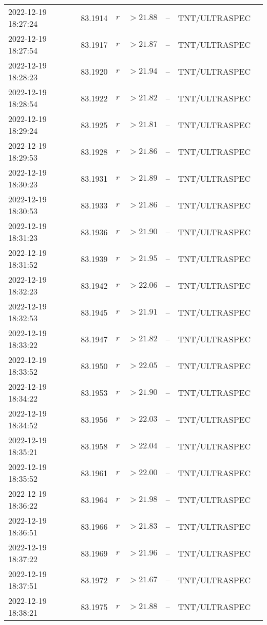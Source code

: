 \documentclass{nature_plusfigure}
\begin{document}
\begin{supplement}
\begin{center}
\begin{longtable}{lllllll}
2022-12-19 18:27:24 & 83.1914 & $r$ & $>21.88$ & -- & TNT/ULTRASPEC &  \\ 
2022-12-19 18:27:54 & 83.1917 & $r$ & $>21.87$ & -- & TNT/ULTRASPEC &  \\ 
2022-12-19 18:28:23 & 83.1920 & $r$ & $>21.94$ & -- & TNT/ULTRASPEC &  \\ 
2022-12-19 18:28:54 & 83.1922 & $r$ & $>21.82$ & -- & TNT/ULTRASPEC &  \\ 
2022-12-19 18:29:24 & 83.1925 & $r$ & $>21.81$ & -- & TNT/ULTRASPEC &  \\ 
2022-12-19 18:29:53 & 83.1928 & $r$ & $>21.86$ & -- & TNT/ULTRASPEC &  \\ 
2022-12-19 18:30:23 & 83.1931 & $r$ & $>21.89$ & -- & TNT/ULTRASPEC &  \\ 
2022-12-19 18:30:53 & 83.1933 & $r$ & $>21.86$ & -- & TNT/ULTRASPEC &  \\ 
2022-12-19 18:31:23 & 83.1936 & $r$ & $>21.90$ & -- & TNT/ULTRASPEC &  \\ 
2022-12-19 18:31:52 & 83.1939 & $r$ & $>21.95$ & -- & TNT/ULTRASPEC &  \\ 
2022-12-19 18:32:23 & 83.1942 & $r$ & $>22.06$ & -- & TNT/ULTRASPEC &  \\ 
2022-12-19 18:32:53 & 83.1945 & $r$ & $>21.91$ & -- & TNT/ULTRASPEC &  \\ 
2022-12-19 18:33:22 & 83.1947 & $r$ & $>21.82$ & -- & TNT/ULTRASPEC &  \\ 
2022-12-19 18:33:52 & 83.1950 & $r$ & $>22.05$ & -- & TNT/ULTRASPEC &  \\ 
2022-12-19 18:34:22 & 83.1953 & $r$ & $>21.90$ & -- & TNT/ULTRASPEC &  \\ 
2022-12-19 18:34:52 & 83.1956 & $r$ & $>22.03$ & -- & TNT/ULTRASPEC &  \\ 
2022-12-19 18:35:21 & 83.1958 & $r$ & $>22.04$ & -- & TNT/ULTRASPEC &  \\ 
2022-12-19 18:35:52 & 83.1961 & $r$ & $>22.00$ & -- & TNT/ULTRASPEC &  \\ 
2022-12-19 18:36:22 & 83.1964 & $r$ & $>21.98$ & -- & TNT/ULTRASPEC &  \\ 
2022-12-19 18:36:51 & 83.1966 & $r$ & $>21.83$ & -- & TNT/ULTRASPEC &  \\ 
2022-12-19 18:37:22 & 83.1969 & $r$ & $>21.96$ & -- & TNT/ULTRASPEC &  \\ 
2022-12-19 18:37:51 & 83.1972 & $r$ & $>21.67$ & -- & TNT/ULTRASPEC &  \\ 
2022-12-19 18:38:21 & 83.1975 & $r$ & $>21.88$ & -- & TNT/ULTRASPEC &  \\ 

\end{longtable}
\end{center}
\end{supplement}
\end{document}

